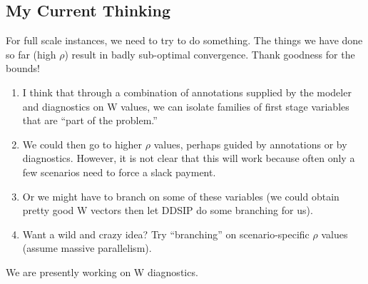 \documentclass[12pt]{article}
\begin{document}
\subsection{My Current Thinking}

For full scale instances, we need to try to do something. The things we have done so far (high $\rho$) result in 
badly sub-optimal convergence. Thank goodness for the bounds!

\begin{enumerate}
\item I think that through a combination of annotations supplied by the modeler and diagnostics on W values, we can isolate families
of first stage variables that are ``part of the problem.''
\item We could then go to higher $\rho$ values, perhaps guided by annotations or by diagnostics. However, it is not clear that this will work
because often only a few scenarios need to force a slack payment.
\item Or we might have to branch on some of these variables (we could obtain pretty good W vectors then let DDSIP do some branching for us).
\item Want a wild and crazy idea? Try ``branching'' on scenario-specific $\rho$ values (assume massive parallelism).
\end{enumerate}

We are presently working on W diagnostics.
\end{document}
